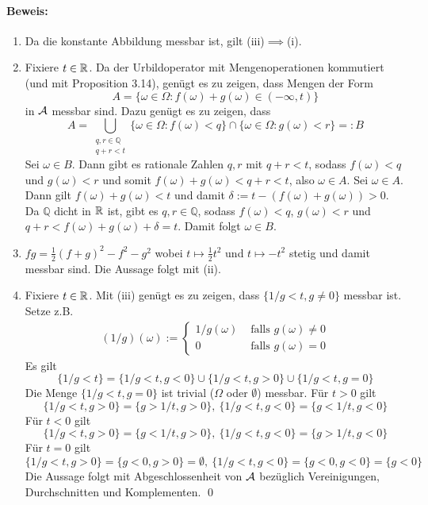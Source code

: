   \paragraph{Beweis:}
  \begin{enumerate}[label=(\roman*)]
      \item Da die konstante Abbildung messbar ist, gilt (iii)$\implies$(i).
      \item Fixiere $t\in\mathbb{R}$. Da der Urbildoperator mit Mengenoperationen kommutiert (und mit Proposition 3.14), gen\"ugt es zu zeigen, dass Mengen der Form
      $$A=\{\omega\in\Omega:f(\omega)+g(\omega)\in(-\infty,t)\}$$
      in $\mathcal{A}$ messbar sind. Dazu gen\"ugt es zu zeigen, dass
      $$A=\bigcup_{\substack{q,r\in\mathbb{Q}\\q+r<t}}\{\omega\in\Omega:f(\omega)<q\}\cap\{\omega\in\Omega:g(\omega)<r\}=:B$$
      Sei $\omega\in B$. Dann gibt es rationale Zahlen $q,r$ mit $q+r<t$, sodass $f(\omega)<q$ und $g(\omega)<r$ und somit $f(\omega)+g(\omega)<q+r<t$, also $\omega\in A$.\newline
      Sei $\omega\in A$. Dann gilt $f(\omega)+g(\omega)<t$ und damit $\delta:=t-(f(\omega)+g(\omega))>0$. Da $\mathbb{Q}$ dicht in $\mathbb{R}$ ist, gibt es $q,r\in\mathbb{Q}$, sodass $f(\omega)<q$, $g(\omega)<r$ und $q+r<f(\omega)+g(\omega)+\delta=t$. Damit folgt $\omega\in B$.
      \item $fg=\frac{1}{2}(f+g)^2-f^2-g^2$ wobei $t\mapsto \frac{1}{2}t^2$ und $t\mapsto -t^2$ stetig und damit messbar sind. Die Aussage folgt mit (ii).
      \item Fixiere $t\in\mathbb{R}$. Mit (iii) gen\"ugt es zu zeigen, dass $\{1/g<t,g\neq0\}$ messbar ist. Setze z.B. 
      \begin{align*}
          (1/g)(\omega):=
        \begin{cases}
          1/g(\omega)&\text{ falls }g(\omega)\neq0\\
          0&\text{ falls }g(\omega)=0
        \end{cases}
      \end{align*}
      Es gilt
      $$\{1/g<t\}=\{1/g<t, g<0\}\cup\{1/g<t,g>0\}\cup\{1/g<t,g=0\}$$
      Die Menge $\{1/g<t,g=0\}$ ist trivial ($\Omega$ oder $\emptyset$) messbar. \newline
      F\"ur $t>0$ gilt 
      $$\{1/g<t,g>0\}=\{g>1/t,g>0\},\ \{1/g<t, g<0\}=\{g<1/t,g<0\} $$
      F\"ur $t<0$ gilt
      $$\{1/g<t,g>0\}=\{g<1/t,g>0\},\ \{1/g<t, g<0\}=\{g>1/t,g<0\} $$
      F\"ur $t=0$ gilt
      $$\{1/g<t,g>0\}=\{g<0,g>0\}=\emptyset,\ \{1/g<t, g<0\}=\{g<0,g<0\}=\{g<0\}$$
      Die Aussage folgt mit Abgeschlossenheit von $\mathcal{A}$ bez\"uglich Vereinigungen, Durchschnitten und Komplementen. \qed
  \end{enumerate}
  
